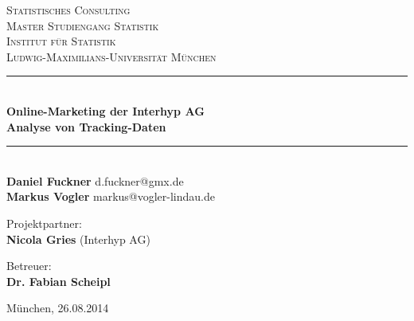 \begin{titlepage}
	\rmfamily
	\begin{center}
	
		\textsc{\LARGE Statistisches Consulting}\\[1.5cm]

		\textsc{
			\large{	Master Studiengang Statistik\\[0.25cm]
							Institut für Statistik\\[0.25cm]
							Ludwig-Maximilians-Universität München}}\\[0.25cm]
						
		\newcommand{\HRule}{\rule{\linewidth}{0.5mm}}
		\HRule \\[0.4cm]
		{\huge \bfseries Online-Marketing der Interhyp AG\\[0.5cm]Analyse von Tracking-Daten}\\[0.4cm]
		\HRule \\[1.5cm]
		
		\textbf{Daniel Fuckner} d.fuckner@gmx.de\\
		\textbf{Markus Vogler} markus@vogler-lindau.de\\[1.5cm]
	
		\begin{minipage}{0.4\textwidth}
			\begin{flushleft}
				Projektpartner:\\
				\textbf{Nicola Gries} (Interhyp AG)
			\end{flushleft}
		\end{minipage}
		\hfill
		\begin{minipage}{0.4\textwidth}
			\begin{flushright}
				Betreuer:\\
				\textbf{Dr. Fabian Scheipl}
			\end{flushright}
		\end{minipage}
		
		\vfill

		{\large München, 26.08.2014}
		
	\end{center}
\end{titlepage}